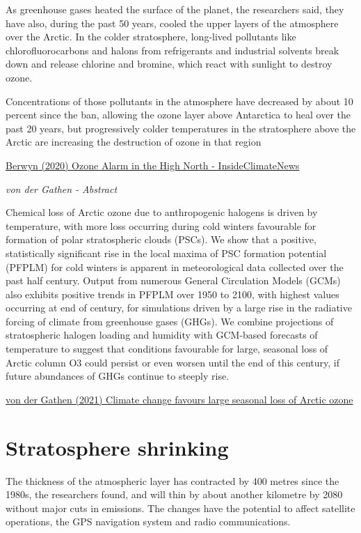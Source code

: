 \documentclass[
]{book}
\begin{document}
As greenhouse gases heated the surface of the planet, the researchers said, they have also, during the past 50 years, cooled the upper layers of the atmosphere over the Arctic. In the colder stratosphere, long-lived pollutants like chlorofluorocarbons and halons from refrigerants and industrial solvents break down and release chlorine and bromine, which react with sunlight to destroy ozone.

Concentrations of those pollutants in the atmosphere have decreased by about 10 percent since the ban, allowing the ozone layer above Antarctica to heal over the past 20 years, but progressively colder temperatures in the stratosphere above the Arctic are increasing the destruction of ozone in that region

\href{https://insideclimatenews.org/news/23062021/climate-research-mosaic-arctic-ozone/}{Berwyn (2020) Ozone Alarm in the High North - InsideClimateNews}

\emph{von der Gathen - Abstract}

Chemical loss of Arctic ozone due to anthropogenic halogens is driven by temperature, with more loss occurring during cold winters favourable for formation of polar stratospheric clouds (PSCs). We show that a positive, statistically significant rise in the local maxima of PSC formation potential (PFPLM) for cold winters is apparent in meteorological data collected over the past half century. Output from numerous General Circulation Models (GCMs) also exhibits positive trends in PFPLM over 1950 to 2100, with highest values occurring at end of century, for simulations driven by a large rise in the radiative forcing of climate from greenhouse gases (GHGs). We combine projections of stratospheric halogen loading and humidity with GCM-based forecasts of temperature to suggest that conditions favourable for large, seasonal loss of Arctic column O3 could persist or even worsen until the end of this century, if future abundances of GHGs continue to steeply rise.

\href{https://www.nature.com/articles/s41467-021-24089-6}{von der Gathen (2021) Climate change favours large seasonal loss of Arctic ozone}

\hypertarget{stratosphere-shrinking}{%
\section{Stratosphere shrinking}\label{stratosphere-shrinking}}

The thickness of the atmospheric layer has contracted by 400 metres since the 1980s, the researchers found, and will thin by about another kilometre by 2080 without major cuts in emissions. The changes have the potential to affect satellite operations, the GPS navigation system and radio communications.
\end{document}
